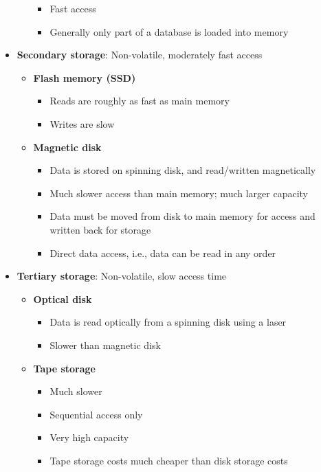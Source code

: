 \begin{itemize}[label=\(\rhd\)]
\begin{itemize}[label=\(\rhd\)]
            \begin{itemize}[label=\(\rhd\)]
                \item Fast access
                \item Generally only part of a database is loaded into memory
            \end{itemize}
        \end{itemize}
    \item \textbf{Secondary storage}: Non-volatile, moderately fast access
    \begin{itemize}[label=\(\rhd\)]
        \item \textbf{Flash memory (SSD)} 
        \begin{itemize}[label=\(\rhd\)]
            \item Reads are roughly as fast as main memory
            \item Writes are slow 
        \end{itemize}
        \item \textbf{Magnetic disk} 
        \begin{itemize}[label=\(\rhd\)]
            \item Data is stored on spinning disk, and read/written magnetically
            \item Much slower access than main memory; much larger capacity
            \item Data must be moved from disk to main memory for access and written back for storage
            \item Direct data access, i.e., data can be read in any order
        \end{itemize}
    \end{itemize}
    \item \textbf{Tertiary storage}: Non-volatile, slow access time
    \begin{itemize}[label=\(\rhd\)]   
        \item \textbf{Optical disk} 
        \begin{itemize}[label=\(\rhd\)]
            \item Data is read optically from a spinning disk using a laser
            \item Slower than magnetic disk
        \end{itemize}
        \item \textbf{Tape storage} 
        \begin{itemize}[label=\(\rhd\)]
            \item Much slower
            \item Sequential access only
            \item Very high capacity
            \item Tape storage costs much cheaper than disk storage costs
        \end{itemize}
    \end{itemize}
\end{itemize}

